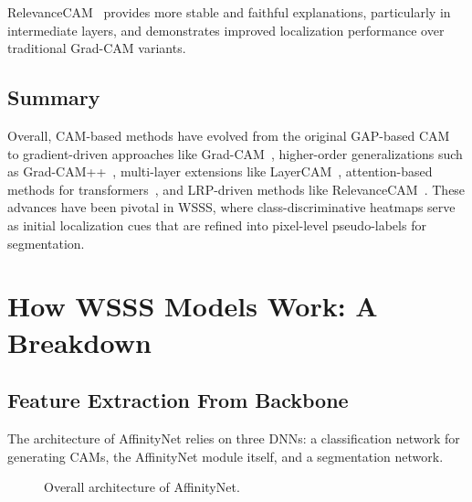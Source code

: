 RelevanceCAM~\cite{relevance_cam} provides more stable and faithful explanations, particularly in intermediate layers, and demonstrates improved localization performance over traditional Grad-CAM variants.

\subsection{Summary}
Overall, CAM-based methods have evolved from the original GAP-based CAM~\cite{cam} to gradient-driven approaches like Grad-CAM~\cite{cam_grad}, higher-order generalizations such as Grad-CAM++~\cite{cam_gradpp}, multi-layer extensions like LayerCAM~\cite{layer_cam}, attention-based methods for transformers~\cite{attention_rollout}, and LRP-driven methods like RelevanceCAM~\cite{relevance_cam}. These advances have been pivotal in WSSS, where class-discriminative heatmaps serve as initial localization cues that are refined into pixel-level pseudo-labels for segmentation.

\section{How WSSS Models Work: A Breakdown}
\label{sec:how-wsss-models-work}

\subsection{Feature Extraction From Backbone}
\label{subsec:feature-extraction-backbone}

The architecture of AffinityNet \cite{wsss_affinitynet} relies on three DNNs: a classification network for generating CAMs, the AffinityNet module itself, and a segmentation network. 
\begin{figure}[htbp]
    \centering
    \caption{Overall architecture of AffinityNet.}
    \label{fig:affinitynet}
\end{figure}

